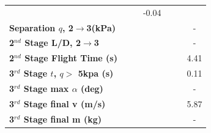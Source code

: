 \begin{table}[ht]
\begin{tabular}{l c c c c c c}
		& \secondthirdSeparationgammamFuelOneHundredFiveNoReturn
		& \secondthirdSeparationgammamFuelOneHundredTenNoReturn
		&-0.04
		\\
		\textbf{Separation $q$, 2$\rightarrow$3(kPa)}
		& \secondthirdSeparationqmFuelNinetyNoReturn
		& \secondthirdSeparationqmFuelNinetyFiveNoReturn
		& \secondthirdSeparationqmFuelStandardNoReturn
		& \secondthirdSeparationqmFuelOneHundredFiveNoReturn
		& \secondthirdSeparationqmFuelOneHundredTenNoReturn
		& -
		\\
		\textbf{2$^{nd}$ Stage L/D, 2$\rightarrow$3}
		& \secondthirdSeparationLDmFuelNinetyNoReturn
		& \secondthirdSeparationLDmFuelNinetyFiveNoReturn
		& \secondthirdSeparationLDmFuelStandardNoReturn
		& \secondthirdSeparationLDmFuelOneHundredFiveNoReturn
		& \secondthirdSeparationLDmFuelOneHundredTenNoReturn
		& -
		\\
		\textbf{2$^{nd}$ Stage Flight Time (s)}
		& \secondFlightTimemFuelNinetyNoReturn
		& \secondFlightTimemFuelNinetyFiveNoReturn
		& \secondFlightTimemFuelStandardNoReturn
		& \secondFlightTimemFuelOneHundredFiveNoReturn
		& \secondFlightTimemFuelOneHundredTenNoReturn
		&4.41
		\\
		\textbf{3$^{rd}$ Stage $t$, $q >$ 5kpa (s)}
		& \thirdqOverFivemFuelNinetyNoReturn
		& \thirdqOverFivemFuelNinetyFiveNoReturn
		& \thirdqOverFivemFuelStandardNoReturn
		& \thirdqOverFivemFuelOneHundredFiveNoReturn
		& \thirdqOverFivemFuelOneHundredTenNoReturn
		&0.11
		\\
		\textbf{3$^{rd}$ Stage max $\alpha$ (deg)}
		& \thirdmaxAoAmFuelNinetyNoReturn
		& \thirdmaxAoAmFuelNinetyFiveNoReturn
		& \thirdmaxAoAmFuelStandardNoReturn
		& \thirdmaxAoAmFuelOneHundredFiveNoReturn
		& \thirdmaxAoAmFuelOneHundredTenNoReturn
		& -
		\\
		\textbf{3$^{rd}$ Stage final v (m/s)}
		& \thirdcircvmFuelNinetyNoReturn
		& \thirdcircvmFuelNinetyFiveNoReturn
		& \thirdcircvmFuelStandardNoReturn
		& \thirdcircvmFuelOneHundredFiveNoReturn
		& \thirdcircvmFuelOneHundredTenNoReturn
		&5.87
		\\
		\textbf{3$^{rd}$ Stage final m (kg)}
		& \thirdcircmmFuelNinetyNoReturn
		& \thirdcircmmFuelNinetyFiveNoReturn
		& \thirdcircmmFuelStandardNoReturn
		& \thirdcircmmFuelOneHundredFiveNoReturn
		& \thirdcircmmFuelOneHundredTenNoReturn
		& -
		\\
		\hline 
	\end{tabular} 
\end{table}

